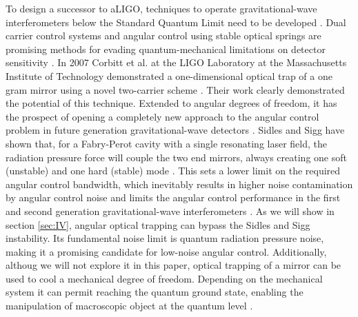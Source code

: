 To design a successor to aLIGO, techniques to operate gravitational-wave interferometers below 
the Standard Quantum Limit need to be developed \cite{Dan12, Chen13}. Dual carrier control systems and angular control 
using stable optical springs are promising methods for evading quantum-mechanical limitations on 
detector sensitivity \cite{LIGO10, Braginsky02b, Arcizet06b, Corbitt06b, Kippenberg05, Sheard04}. 
In 2007 Corbitt et al. at the LIGO Laboratory at the Massachusetts Institute of Technology 
demonstrated a one-dimensional optical trap of a one gram mirror using a novel two-carrier scheme \cite{Corbitt07}. 
Their work 
clearly demonstrated the potential of this technique. Extended to angular degrees of freedom, it has 
the prospect of opening a completely new approach to the angular control problem in future generation 
gravitational-wave detectors \cite{Punturo10}. 
Sidles and Sigg have shown that, for a Fabry-Perot cavity with a single 
resonating laser field, the radiation pressure force will couple the two end mirrors, always creating one 
soft (unstable) and one hard (stable) mode \cite{Sidles06}. This sets a lower limit on the required angular control 
bandwidth, which inevitably results in higher noise contamination by angular control noise and limits the angular control performance in the first and second generation 
gravitational-wave interferometers \cite{LIGO10, Braginsky01, Dooley13, Hirose10}. 
As we will show in section \ref{sec:IV}, angular optical trapping can bypass the Sidles and Sigg instability. Its fundamental noise limit is quantum radiation pressure noise, making it a promising candidate for low-noise angular control. Additionally, 
althoug we will not explore it in this paper, optical trapping of a mirror can be used to cool a mechanical degree of freedom. Depending on the mechanical system it can permit reaching the quantum ground state, enabling the manipulation of macroscopic object at the quantum level \cite{Teufel11, OConnell10, Chan11, TCorbitt07, Matsumoto13}. 

